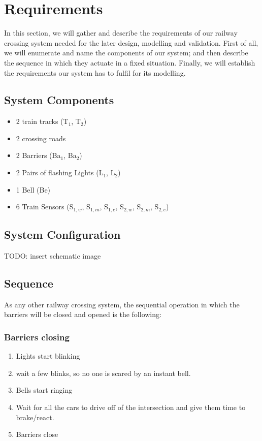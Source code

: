 \documentclass[final]{report}
\begin{document}
\chapter{Requirements}
In this section, we will gather and describe the requirements of our railway crossing system needed for the later design, modelling and validation. First of all, we will enumerate and name the components of our system; and then describe the sequence in which they actuate in a fixed situation. Finally, we will establish the requirements our system has to fulfil for its modelling. 

\section{System Components} 
\begin{itemize}
\item 2 train tracks (T$_{1}$, T$_{2}$)
\item 2 crossing roads 
\item 2 Barriers (Ba$_{1}$, Ba$_{2}$)
\item 2 Pairs of flashing Lights (L$_{1}$, L$_{2}$) 
\item 1 Bell (Be)
\item 6 Train Sensors (S$_{1,w}$, S$_{1,m}$, S$_{1,e}$, S$_{2,w}$, S$_{2,m}$, S$_{2,e}$)
\end{itemize}
\section{System Configuration}
TODO: insert schematic image

\section{Sequence}
As any other railway crossing system, the sequential operation in which the barriers will be closed and opened is the following:

\subsection{Barriers closing}
\begin{enumerate}
\item Lights start blinking
\item wait a few blinks, so no one is scared by an instant bell. %
\item Bells start ringing
\item Wait for all the cars to drive off of the intersection and give them time to brake/react.
\item Barriers close
\end{enumerate}
\end{document}
